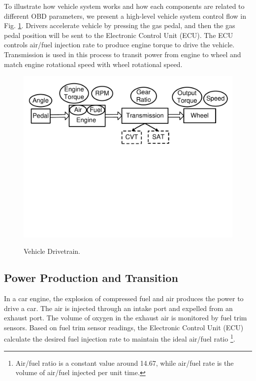 


To illustrate how vehicle system works 
and how each components are related to different OBD parameters,
we present a high-level vehicle system control 
flow in Fig. \ref{vehicle_system}. 
Drivers accelerate vehicle by pressing the gas pedal, 
and then the gas pedal position will be sent to 
the Electronic Control Unit (ECU). 
The ECU controls air/fuel injection rate
to produce engine torque to drive the vehicle.   
Transmission is used in this process 
to transit power from engine to wheel and 
match engine rotational speed with wheel rotational speed. 


\begin{figure}[t]
\begin{center}
\vspace{-0.0cm}
\includegraphics[width=5.0in,angle=0]{Figs/EcoDrive/drivetrain.pdf}
\vspace{-5.5cm}
\caption{Vehicle Drivetrain.}
\vspace{-0.5cm}
\label{vehicle_system}
\end{center}
\end{figure}


\subsection{Power Production and Transition}

In a car engine, the explosion of compressed fuel and air 
produces the power to drive a car.
The air is injected through an intake port and expelled from an exhaust port.
The volume of oxygen in the exhaust air is monitored by fuel trim sensors. 
Based on fuel trim sensor readings, the Electronic Control Unit (ECU) 
calculate the desired fuel injection rate to maintain the
ideal air/fuel ratio 
\footnote{Air/fuel ratio is a constant value around 14.67, 
while air/fuel rate is the volume of air/fuel injected per unit time.}. 



